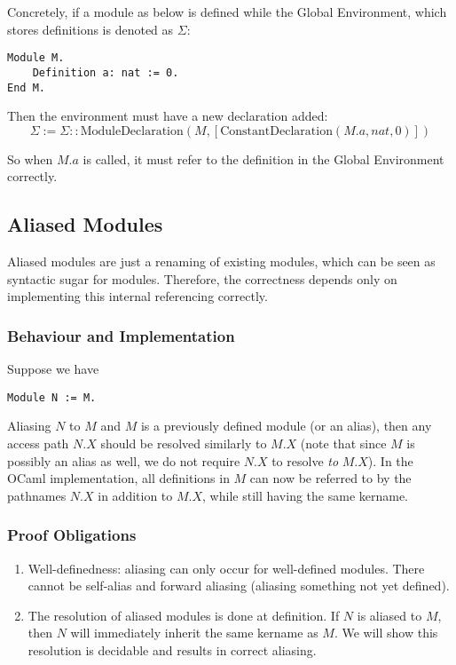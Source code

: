 Concretely, if a module as below is defined while the Global Environment, which
stores definitions is denoted as $\Sigma$:
\begin{verbatim}
Module M.
    Definition a: nat := 0.
End M.
\end{verbatim}
Then the environment must have a new declaration added:
\[\Sigma := \Sigma :: \text{ModuleDeclaration}(M,
[\text{ConstantDeclaration}(M.a, nat, 0)])\]

So when $M.a$ is called, it must refer to the definition in the Global
Environment correctly.

\subsection{Aliased Modules}
Aliased modules are just a renaming of existing modules, which can be seen as
syntactic sugar for modules. Therefore, the correctness depends only on
implementing this internal referencing correctly.

\subsubsection{Behaviour and Implementation}
Suppose we have

\begin{verbatim}
Module N := M.
\end{verbatim}

Aliasing $N$ to $M$ and $M$ is a previously defined module (or an alias),
then any access path $N.X$ should be resolved similarly to
$M.X$ (note that since $M$ is possibly an alias as well, we do not require $N.X$
to resolve \emph{to} $M.X$). In the OCaml implementation, all definitions in $M$
can now be referred to by the pathnames $N.X$ in addition to $M.X$, while still
having the same kername.

\subsubsection{Proof Obligations}
\begin{enumerate}
\item Well-definedness: aliasing can only occur for well-defined modules. There
    cannot be self-alias and forward aliasing (aliasing something not yet defined).
\item The resolution of aliased modules is done at definition. If $N$ is aliased
    to $M$, then $N$ will immediately inherit the same kername as $M$. We will
    show this resolution is decidable and results in correct aliasing.
\end{enumerate}

